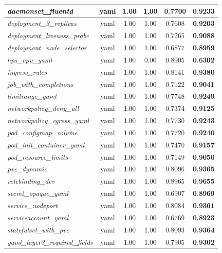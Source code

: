 \begin{footnotesize}
\begin{longtable}{|p{3.6cm}|c|c|c|c|c|}
\hline
\textit{daemonset\_\allowbreak{}fluentd} & yaml & 1.00 & 1.00 & 0.7700 & \textbf{0.9233} \\
\hline
\textit{deployment\_\allowbreak{}3\_\allowbreak{}replicas} & yaml & 1.00 & 1.00 & 0.7608 & \textbf{0.9203} \\
\hline
\textit{deployment\_\allowbreak{}liveness\_\allowbreak{}probe} & yaml & 1.00 & 1.00 & 0.7265 & \textbf{0.9088} \\
\hline
\textit{deployment\_\allowbreak{}node\_\allowbreak{}selector} & yaml & 1.00 & 1.00 & 0.6877 & \textbf{0.8959} \\
\hline
\textit{hpa\_\allowbreak{}cpu\_\allowbreak{}yaml} & yaml & 1.00 & 0.00 & 0.8905 & \textbf{0.6302} \\
\hline
\textit{ingress\_\allowbreak{}rules} & yaml & 1.00 & 1.00 & 0.8141 & \textbf{0.9380} \\
\hline
\textit{job\_\allowbreak{}with\_\allowbreak{}completions} & yaml & 1.00 & 1.00 & 0.7122 & \textbf{0.9041} \\
\hline
\textit{limitrange\_\allowbreak{}yaml} & yaml & 1.00 & 1.00 & 0.7748 & \textbf{0.9249} \\
\hline
\textit{networkpolicy\_\allowbreak{}deny\_\allowbreak{}all} & yaml & 1.00 & 1.00 & 0.7374 & \textbf{0.9125} \\
\hline
\textit{networkpolicy\_\allowbreak{}egress\_\allowbreak{}yaml} & yaml & 1.00 & 1.00 & 0.7730 & \textbf{0.9243} \\
\hline
\textit{pod\_\allowbreak{}configmap\_\allowbreak{}volume} & yaml & 1.00 & 1.00 & 0.7720 & \textbf{0.9240} \\
\hline
\textit{pod\_\allowbreak{}init\_\allowbreak{}container\_\allowbreak{}yaml} & yaml & 1.00 & 1.00 & 0.7470 & \textbf{0.9157} \\
\hline
\textit{pod\_\allowbreak{}resource\_\allowbreak{}limits} & yaml & 1.00 & 1.00 & 0.7149 & \textbf{0.9050} \\
\hline
\textit{pvc\_\allowbreak{}dynamic} & yaml & 1.00 & 1.00 & 0.8096 & \textbf{0.9365} \\
\hline
\textit{rolebinding\_\allowbreak{}dev} & yaml & 1.00 & 1.00 & 0.8965 & \textbf{0.9655} \\
\hline
\textit{secret\_\allowbreak{}opaque\_\allowbreak{}yaml} & yaml & 1.00 & 1.00 & 0.6907 & \textbf{0.8969} \\
\hline
\textit{service\_\allowbreak{}nodeport} & yaml & 1.00 & 1.00 & 0.8084 & \textbf{0.9361} \\
\hline
\textit{serviceaccount\_\allowbreak{}yaml} & yaml & 1.00 & 1.00 & 0.6769 & \textbf{0.8923} \\
\hline
\textit{statefulset\_\allowbreak{}with\_\allowbreak{}pvc} & yaml & 1.00 & 1.00 & 0.8093 & \textbf{0.9364} \\
\hline
\textit{yaml\_\allowbreak{}layer3\_\allowbreak{}required\_\allowbreak{}fields} & yaml & 1.00 & 1.00 & 0.7905 & \textbf{0.9302} \\
\hline
\end{longtable}
\end{footnotesize}

